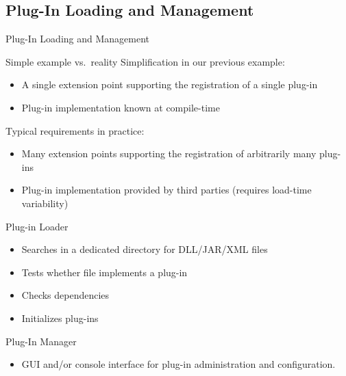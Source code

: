 \subsection{Plug-In Loading and Management}
\begin{frame}{Plug-In Loading and Management}
	\begin{mycolumns}[widths={50,50}]
		\begin{note}{Simple example vs.\ reality}
			Simplification in our previous example:
			\begin{itemize}
				\item A single extension point supporting the registration of a single plug-in 
				\item Plug-in implementation known at compile-time 
			\end{itemize}
			Typical requirements in practice:
			\begin{itemize}
				\item Many extension points supporting the registration of arbitrarily many plug-ins 
				\item Plug-in implementation provided by third parties (requires load-time variability)
			\end{itemize}
		\end{note}
	\mynextcolumn
		\begin{definition}{Plug-in Loader}
			\begin{itemize}
				\item Searches in a dedicated directory for DLL/JAR/XML files
				\item Tests whether file implements a plug-in
				\item Checks dependencies
				\item Initializes plug-ins
			\end{itemize}
		\end{definition}
		\begin{definition}{Plug-In Manager}
			\begin{itemize}
				\item GUI and/or console interface for plug-in administration and configuration.
			\end{itemize}
		\end{definition}
	\end{mycolumns}
\end{frame}

